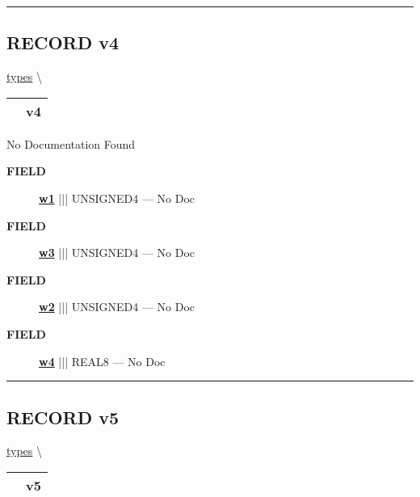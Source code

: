 \rule{\linewidth}{0.5pt}
\subsection*{\textsf{\colorbox{headtoc}{\color{white} RECORD}
v4}}

\hypertarget{ecldoc:types.v4}{}
\hspace{0pt} \hyperlink{ecldoc:types}{types} \textbackslash 

{\renewcommand{\arraystretch}{1.5}
\begin{tabularx}{\textwidth}{|>{\raggedright\arraybackslash}l|X|}
\hline
\hspace{0pt}\mytexttt{\color{red} } & \textbf{v4} \\
\hline
\end{tabularx}
}

\par





No Documentation Found







\par
\begin{description}
\item [\colorbox{tagtype}{\color{white} \textbf{\textsf{FIELD}}}] \textbf{\underline{w1}} ||| UNSIGNED4 --- No Doc
\item [\colorbox{tagtype}{\color{white} \textbf{\textsf{FIELD}}}] \textbf{\underline{w3}} ||| UNSIGNED4 --- No Doc
\item [\colorbox{tagtype}{\color{white} \textbf{\textsf{FIELD}}}] \textbf{\underline{w2}} ||| UNSIGNED4 --- No Doc
\item [\colorbox{tagtype}{\color{white} \textbf{\textsf{FIELD}}}] \textbf{\underline{w4}} ||| REAL8 --- No Doc
\end{description}





\rule{\linewidth}{0.5pt}
\subsection*{\textsf{\colorbox{headtoc}{\color{white} RECORD}
v5}}

\hypertarget{ecldoc:types.v5}{}
\hspace{0pt} \hyperlink{ecldoc:types}{types} \textbackslash 

{\renewcommand{\arraystretch}{1.5}
\begin{tabularx}{\textwidth}{|>{\raggedright\arraybackslash}l|X|}
\hline
\hspace{0pt}\mytexttt{\color{red} } & \textbf{v5} \\
\hline
\end{tabularx}
}

